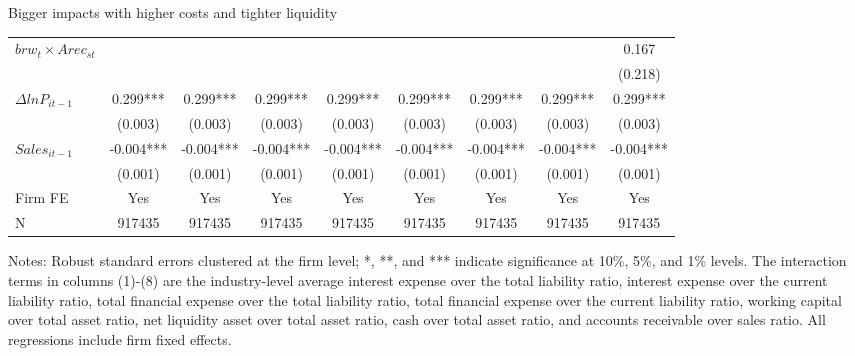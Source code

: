 \documentclass[10pt]{beamer}
\begin{document}
\begin{frame}{Bigger impacts with higher costs and tighter liquidity}
\begin{table}[htbp]
{\begin{threeparttable}
\begin{tabular}{lcccccccc}
        $brw_t \times Arec_{st}$ &       &       &       &       &       &       &       & 0.167 \\
              &       &       &       &       &       &       &       & (0.218) \\
        $\Delta ln P_{it-1}$ & 0.299*** & 0.299*** & 0.299*** & 0.299*** & 0.299*** & 0.299*** & 0.299*** & 0.299*** \\
              & (0.003) & (0.003) & (0.003) & (0.003) & (0.003) & (0.003) & (0.003) & (0.003) \\
        $Sales_{it-1}$ & -0.004*** & -0.004*** & -0.004*** & -0.004*** & -0.004*** & -0.004*** & -0.004*** & -0.004*** \\
              & (0.001) & (0.001) & (0.001) & (0.001) & (0.001) & (0.001) & (0.001) & (0.001) \\
        \midrule
        Firm FE & Yes   & Yes   & Yes   & Yes   & Yes   & Yes   & Yes   & Yes \\
        N     & 917435 & 917435 & 917435 & 917435 & 917435 & 917435 & 917435 & 917435 \\
            \bottomrule
        \end{tabular}
            \begin{tablenotes}
                \footnotesize
                \item Notes: Robust standard errors clustered at the firm level;  *, **, and *** indicate significance at 10\%, 5\%, and 1\% levels. The interaction terms in columns (1)-(8) are the industry-level average interest expense over the total liability ratio, interest expense over the current liability ratio, total financial expense over the total liability ratio, total financial expense over the current liability ratio, working capital over total asset ratio, net liquidity asset over total asset ratio, cash over total asset ratio, and accounts receivable over sales ratio. All regressions include firm fixed effects.
    	\end{tablenotes}
        \end{threeparttable}
        }
        \label{tab.non-linearity}
    \end{table}
\end{frame}
\end{document}
